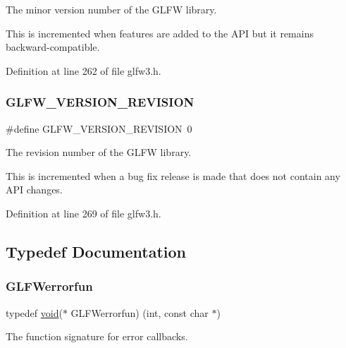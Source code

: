 The minor version number of the G\+L\+FW library. 

This is incremented when features are added to the A\+PI but it remains backward-\/compatible. 

Definition at line 262 of file glfw3.\+h.

\mbox{\label{group__init_gab72ae2e2035d9ea461abc3495eac0502}} 
\subsubsection{\texorpdfstring{GLFW\_VERSION\_REVISION}{GLFW\_VERSION\_REVISION}}
{\footnotesize\ttfamily \#define G\+L\+F\+W\+\_\+\+V\+E\+R\+S\+I\+O\+N\+\_\+\+R\+E\+V\+I\+S\+I\+ON~0}



The revision number of the G\+L\+FW library. 

This is incremented when a bug fix release is made that does not contain any A\+PI changes. 

Definition at line 269 of file glfw3.\+h.



\subsection{Typedef Documentation}
\mbox{\label{group__init_ga6b8a2639706d5c409fc1287e8f55e928}} 
\subsubsection{\texorpdfstring{GLFWerrorfun}{GLFWerrorfun}}
{\footnotesize\ttfamily typedef \mbox{\hyperlink{glad_8h_a950fc91edb4504f62f1c577bf4727c29}{void}}($\ast$  G\+L\+F\+Werrorfun) (int, const char $\ast$)}



The function signature for error callbacks. 

